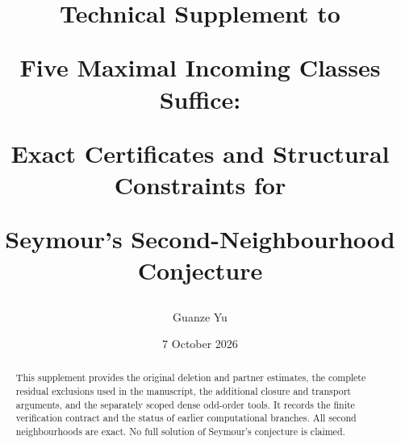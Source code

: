 \documentclass[11pt]{article}
\title{Technical Supplement to\par Five Maximal Incoming Classes Suffice:\par
Exact Certificates and Structural Constraints for\par Seymour's Second-Neighbourhood Conjecture}
\author{Guanze Yu}
\date{7 October 2026}
\begin{document}
\maketitle
\begin{abstract}
This supplement provides the original deletion and partner estimates,
the complete residual exclusions used in the manuscript, the additional
closure and transport arguments, and the separately scoped dense odd-order
tools. It records the finite verification contract and the status of earlier
computational branches. All second neighbourhoods are exact. No full solution
of Seymour's conjecture is claimed.
\end{abstract}
\tableofcontents
\clearpage




\end{document}
